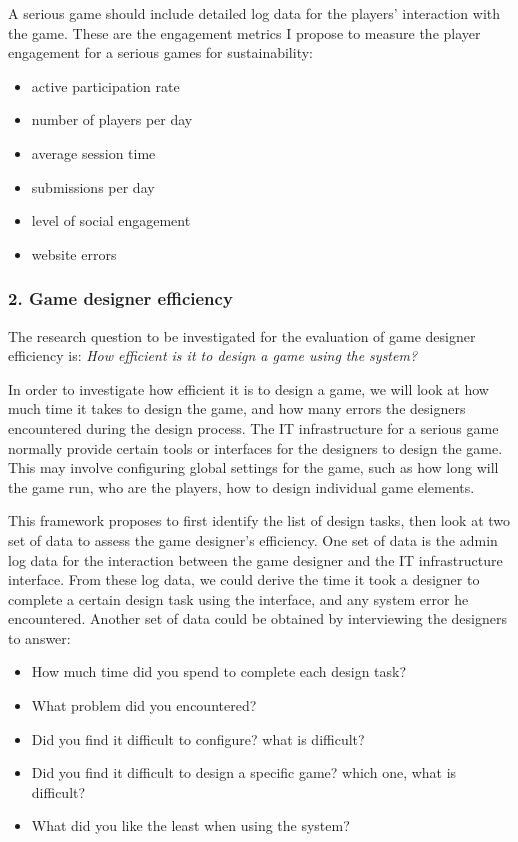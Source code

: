 \documentclass{sigchi}
\begin{document}
A serious game should include detailed log data for the players' interaction with the game. These are the engagement metrics I propose to measure the player engagement for a serious games for sustainability:

\begin{itemize}
\item active participation rate
\item number of players per day
\item average session time
\item submissions per day
\item level of social engagement
\item website errors
\end{itemize}

\subsubsection{2. Game designer efficiency}
The research question to be investigated for the evaluation of game designer efficiency is: \emph{How efficient is it to design a game using the system?}

In order to investigate how efficient it is to design a game, we will look at how much time it takes to design the game, and how many errors the designers encountered during the design process.
The IT infrastructure for a serious game normally provide certain tools or interfaces for the designers to design the game. This may involve configuring global settings for the game, such as how long will the game run, who are the players, how to design individual game elements.

This framework proposes to first identify the list of design tasks, then look at two set of data to assess the game designer's efficiency. One set of data is the admin log data for the interaction between the game designer and the IT infrastructure interface. From these log data, we could derive the time it took a designer to complete a certain design task using the interface, and any system error he encountered. Another set of data could be obtained by interviewing the designers to answer:
\begin{itemize}
    \item How much time did you spend to complete each design task?
    \item What problem did you encountered?
    \item Did you find it difficult to configure? what is difficult?
    \item Did you find it difficult to design a specific game? which one, what is difficult?
    \item What did you like the least when using the system?
\end{itemize}
\end{document}
